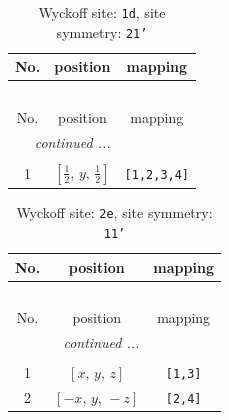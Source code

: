 \documentclass[fleqn,8pt]{jsarticle}
\begin{document}
\renewcommand{\arraystretch}{1.2}
\begin{longtable}{ccc}
\caption{Wyckoff site: {\tt 1d}, site symmetry: {\tt 21'}}
 \\
 \hline \hline
No. & position & mapping \\ \hline \endfirsthead

\multicolumn{2}{l}{\tablename\ \thetable{}} \\
 \hline \hline
No. & position & mapping \\ \hline \endhead

 \hline \hline
\multicolumn{2}{r}{\footnotesize\it continued ...} \\ \endfoot

 \hline \hline
\multicolumn{2}{r}{} \\ \endlastfoot

1 & $\left[ \frac{1}{2},\, y,\, \frac{1}{2} \right]$ & {\tt [1,2,3,4]} \\
\end{longtable}
\renewcommand{\arraystretch}{1.2}
\begin{longtable}{ccc}
\caption{Wyckoff site: {\tt 2e}, site symmetry: {\tt 11'}}
 \\
 \hline \hline
No. & position & mapping \\ \hline \endfirsthead

\multicolumn{2}{l}{\tablename\ \thetable{}} \\
 \hline \hline
No. & position & mapping \\ \hline \endhead

 \hline \hline
\multicolumn{2}{r}{\footnotesize\it continued ...} \\ \endfoot

 \hline \hline
\multicolumn{2}{r}{} \\ \endlastfoot

1 & $\left[ x,\, y,\, z \right]$ & {\tt [1,3]} \\ \hline
2 & $\left[ - x,\, y,\, - z \right]$ & {\tt [2,4]} \\
\end{longtable}
\end{document}
